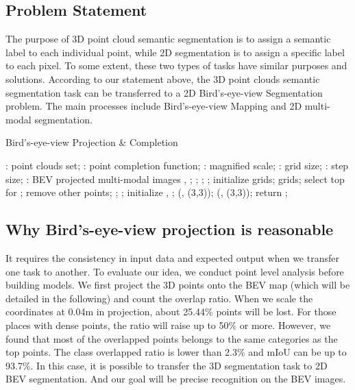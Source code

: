 \documentclass[conference]{IEEEtran}
\begin{document}
\subsection{Problem Statement}
The purpose of 3D point cloud semantic segmentation is to assign a semantic label to each individual point, while 2D segmentation is to assign a specific label to each pixel. To some extent, these two types of tasks have similar purposes and solutions.
According to our statement above, the 3D point clouds semantic segmentation task can be transferred to a 2D Bird's-eye-view Segmentation problem. The main processes include Bird's-eye-view Mapping and 2D multi-modal segmentation.

\begin{algorithm}[b!]  
  \caption{Bird's-eye-view Projection \& Completion}  
  \label{BEVprojection}  
  \begin{algorithmic}[1]  
    \Require  
      : point clouds set;
      : point completion function;   \newline
      : magnified scale;
      : grid size;
      : step size; 
    \Ensure  
      : BEV projected multi-modal images , 
\For{}
        \State ;
        \For{}
            \State ;
            \State ;
        \EndFor
        \State ;
        \For{}
            \For{}
                \State initialize grids;
                \If{}
                    \State grids;
                \EndIf
                \For{}
                    \State select top  for ;
                    \State remove other points;
                    \State ;
                    \State ;
                \EndFor
                \State initialize , ;  
                \State  (, (3,3));
                \State  (, (3,3));
                \State return ;
            \EndFor
        \EndFor
    \EndFor
  \end{algorithmic}  
\end{algorithm}

\subsection{Why Bird's-eye-view projection is reasonable}
It requires the consistency in input data and expected output when we transfer one task to another. To evaluate our idea, we conduct point level analysis before building models. We first project the 3D points onto the BEV map (which will be detailed in the following) and count the overlap ratio. When we scale the coordinates at 0.04m in projection, about 25.44\% points will be lost. For those places with dense points, the ratio will raise up to 50\% or more. However, we found that most of the overlapped points belongs to the same categories as the top points. The class overlapped ratio is lower than 2.3\% and mIoU can be up to 93.7\%. In this case, it is possible to transfer the 3D segmentation task to 2D BEV segmentation. And our goal will be precise recognition on the BEV images.
\end{document}
